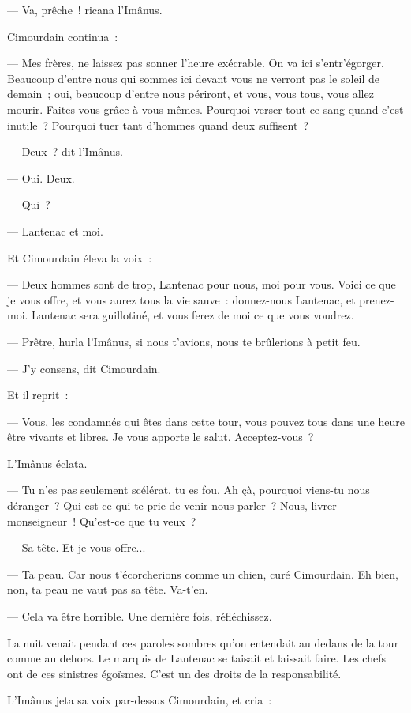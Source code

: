 \documentclass[french,twoside]{book} %
\begin{document}
— Va, prêche ! ricana l’Imânus.\par
Cimourdain continua :\par
 — Mes frères, ne laissez pas sonner l’heure exécrable. On va ici s’entr’égorger. Beaucoup d’entre nous qui sommes ici devant vous ne verront pas le soleil de demain ; oui, beaucoup d’entre nous périront, et vous, vous tous, vous allez mourir. Faites-vous grâce à vous-mêmes. Pourquoi verser tout ce sang quand c’est inutile ? Pourquoi tuer tant d’hommes quand deux suffisent ?\par
— Deux ? dit l’Imânus.\par
— Oui. Deux.\par
— Qui ?\par
— Lantenac et moi.\par
Et Cimourdain éleva la voix :\par
— Deux hommes sont de trop, Lantenac pour nous, moi pour vous. Voici ce que je vous offre, et vous aurez tous la vie sauve : donnez-nous Lantenac, et prenez-moi. Lantenac sera guillotiné, et vous ferez de moi ce que vous voudrez.\par
— Prêtre, hurla l’Imânus, si nous t’avions, nous te brûlerions à petit feu.\par
— J’y consens, dit Cimourdain.\par
Et il reprit :\par
— Vous, les condamnés qui êtes dans cette tour, vous pouvez tous dans une heure être vivants et libres. Je vous apporte le salut. Acceptez-vous ?\par
L’Imânus éclata.\par
— Tu n’es pas seulement scélérat, tu es fou. Ah çà, pourquoi viens-tu nous déranger ? Qui est-ce qui te prie de venir nous parler ? Nous, livrer monseigneur ! Qu’est-ce que tu veux ?\par
 — Sa tête. Et je vous offre...\par
— Ta peau. Car nous t’écorcherions comme un chien, curé Cimourdain. Eh bien, non, ta peau ne vaut pas sa tête. Va-t’en.\par
— Cela va être horrible. Une dernière fois, réfléchissez.\par
La nuit venait pendant ces paroles sombres qu’on entendait au dedans de la tour comme au dehors. Le marquis de Lantenac se taisait et laissait faire. Les chefs ont de ces sinistres égoïsmes. C’est un des droits de la responsabilité.\par
L’Imânus jeta sa voix par-dessus Cimourdain, et cria :\par
\end{document}
